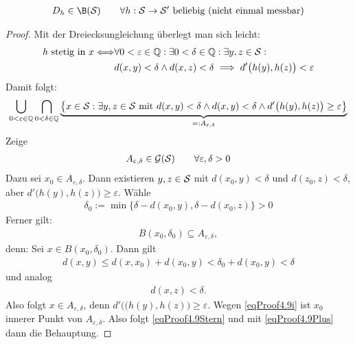 \begin{lemma}\label{lemma4.9}
	\begin{align*}
		D_h\in\B(\S)\qquad\forall h:\S\to\S'\text{ beliebig (nicht einmal messbar)}
	\end{align*}
\end{lemma}

\begin{proof}
	Mit der Dreiecksungleichung überlegt man sich leicht:
	\begin{align*}
		h\text{ stetig in }x
		\Longleftrightarrow
		&\forall 0<\varepsilon\in\Q:\exists 0<\delta\in\Q:\exists y,z\in\S:\\
		&d(x,y)<\delta\wedge d(x,z)<\delta
		\implies d'\big(h(y),h(z)\big)<\varepsilon
	\end{align*}
	Damit folgt:
	\begin{align}\label{eqProof4.9Plus}
		\bigcup\limits_{0<\varepsilon\in\Q}\bigcap\limits_{0<\delta\in\Q}\underbrace{\big\lbrace x\in\S:
		\exists y,z\in\S\mit d(x,y)<\delta\wedge d(x,y)<\delta\wedge d'\big(h(y),h(z)\big)\geq\varepsilon\big\rbrace}_{=:A_{\varepsilon,\delta}}
	\end{align}
	Zeige 
	\begin{align}\label{eqProof4.9Stern}
		A_{\varepsilon,\delta}\in\G(\S)\qquad\forall\varepsilon,\delta>0
	\end{align}
	Dazu sei $x_0\in A_{\varepsilon,\delta}$. 
	Dann existieren $y,z\in\S$ mit $d(x_0,y)<\delta$ und $d(z_0,z)<\delta$, aber $d'\big(h(y),h(z)\big)\geq\varepsilon$. 
	Wähle
	\begin{align*}
		\delta_0:=\min\big\lbrace\delta- d(x_0,y),\delta-d(x_0,z)\big\rbrace>0
	\end{align*}
	Ferner gilt:
	\begin{align}\label{eqProof4.9i}
		B(x_0,\delta_0)\subseteq A_{\varepsilon,\delta},
	\end{align}
	denn: Sei $x\in B(x_0,\delta_0)$. 
	Dann gilt
	\begin{align*}
		d(x,y)\leq d(x,x_0)+d(x_0,y)<\delta_0+d(x_0,y)<\delta
	\end{align*}
	und analog
	\begin{align*}
		d(x,z)<\delta.
	\end{align*}
	Also folgt $x\in A_{\varepsilon,\delta}$, denn $d'\big((h(y),h(z)\big)\geq\varepsilon$. 
	Wegen \eqref{eqProof4.9i} ist $x_0$ innerer Punkt von $A_{\varepsilon,\delta}$. 
	Also folgt \eqref{eqProof4.9Stern} und mit \eqref{eqProof4.9Plus} dann die Behauptung.
\end{proof}

